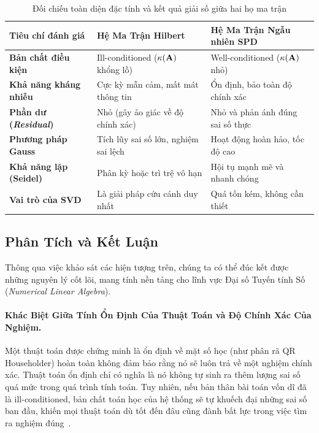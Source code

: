 \begin{table}[H]
\centering
\caption{Đối chiếu toàn diện đặc tính và kết quả giải số giữa hai họ ma trận}
\label{tab:comparison_matrices_detailed}
\renewcommand{\arraystretch}{1.4}
\setlength{\tabcolsep}{12pt}
\begin{tabular}{p{3.5cm}p{5cm}p{5cm}}
\toprule
\textbf{Tiêu chí đánh giá} & \textbf{Hệ Ma Trận Hilbert} & \textbf{Hệ Ma Trận Ngẫu nhiên SPD} \\
\midrule
\textbf{Bản chất điều kiện} & Ill-conditioned ($\kappa(\mathbf{A})$ khổng lồ) & Well-conditioned ($\kappa(\mathbf{A})$ nhỏ) \\
\textbf{Khả năng kháng nhiễu} & Cực kỳ mẫn cảm, mất mát thông tin & Ổn định, bảo toàn độ chính xác \\
\textbf{Phần dư (\textit{Residual})} & Nhỏ (gây ảo giác về độ chính xác) & Nhỏ và phản ánh đúng sai số thực \\
\textbf{Phương pháp Gauss} & Tích lũy sai số lớn, nghiệm sai lệch & Hoạt động hoàn hảo, tốc độ cao \\
\textbf{Khả năng lặp (Seidel)} & Phân kỳ hoặc trì trệ vô hạn & Hội tụ mạnh mẽ và nhanh chóng \\
\textbf{Vai trò của SVD} & Là giải pháp cứu cánh duy nhất & Quá tốn kém, không cần thiết \\
\bottomrule
\end{tabular}
\end{table}

\subsection{Phân Tích và Kết Luận}

Thông qua việc khảo sát các hiện tượng trên, chúng ta có thể đúc kết được những nguyên lý cốt lõi, mang tính nền tảng cho lĩnh vực Đại số Tuyến tính Số (\textit{Numerical Linear Algebra}).

\paragraph*{Khác Biệt Giữa Tính Ổn Định Của Thuật Toán và Độ Chính Xác Của Nghiệm.}
Một thuật toán được chứng minh là ổn định về mặt số học (như phân rã QR Householder) hoàn toàn không đảm bảo rằng nó sẽ luôn trả về một nghiệm chính xác. Thuật toán ổn định chỉ có nghĩa là nó không tự sinh ra thêm lượng sai số quá mức trong quá trình tính toán. Tuy nhiên, nếu bản thân bài toán vốn dĩ đã là ill-conditioned, bản chất toán học của hệ thống sẽ tự khuếch đại những sai số ban đầu, khiến mọi thuật toán dù tốt đến đâu cũng đành bất lực trong việc tìm ra nghiệm đúng~\cite{trefethen1997, higham2002, wilkinson1965}.

